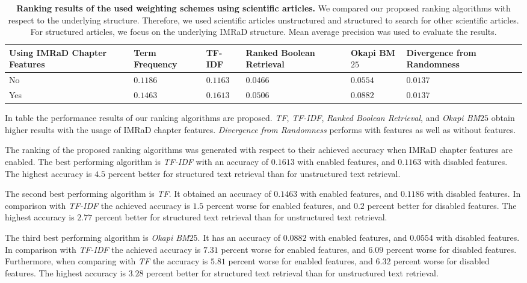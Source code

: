 \begin{table}[b!]
    \centering
    \begin{tabular}{ C{2.1cm} C{2.1cm} C{2.1cm} C{2.1cm} C{2.1cm} C{2.1cm} }
      \toprule
      \textbf{Using IMRaD Chapter Features} & \textbf{Term Frequency} & \textbf{TF-IDF} & \textbf{Ranked Boolean Retrieval} & \textbf{Okapi BM$25$} & \textbf{Divergence from Randomness} \\ \midrule
      No  & $0.1186$ & $0.1163$ & $0.0466$ & $0.0554$ & $0.0137$ \\
      Yes & $0.1463$ & $0.1613$ & $0.0506$ & $0.0882$ & $0.0137$ \\
      \bottomrule
    \end{tabular}
  \caption[Ranking results using scientific articles]{\textbf{Ranking results of the used weighting schemes using scientific articles.} We compared our proposed ranking algorithms with respect to the underlying structure. Therefore, we used scientific articles unstructured and structured to search for other scientific articles. For structured articles, we focus on the underlying IMRaD structure. Mean average precision was used to evaluate the results.}
  \label{tbl:ranking_result_full}
\end{table}

In table  the performance results of our ranking algorithms are proposed. \textit{TF}, \textit{TF-IDF}, \textit{Ranked Boolean Retrieval}, and \textit{Okapi BM$25$} obtain higher results with the usage of IMRaD chapter features. \textit{Divergence from Randomness} performs with features as well as without features.

The ranking of the proposed ranking algorithms was generated with respect to their achieved accuracy when IMRaD chapter features are enabled.  The best performing algorithm is \textit{TF-IDF} with an accuracy of $0.1613$ with enabled features, and $0.1163$ with disabled features. The highest accuracy is $4.5$ percent better for structured text retrieval than for unstructured text retrieval.

The second best performing algorithm is \textit{TF}. It obtained an accuracy of $0.1463$ with enabled features, and $0.1186$ with disabled features. In comparison with \textit{TF-IDF} the achieved accuracy is $1.5$ percent worse for enabled features, and $0.2$ percent better for disabled features. The highest accuracy is $2.77$ percent better for structured text retrieval than for unstructured text retrieval.

The third best performing algorithm is \textit{Okapi BM$25$}. It has an accuracy of $0.0882$ with enabled features, and $0.0554$ with disabled features. In comparison with \textit{TF-IDF} the achieved accuracy is $7.31$ percent worse for enabled features, and $6.09$ percent worse for disabled features. Furthermore, when comparing with \textit{TF} the accuracy is $5.81$ percent worse for enabled features, and $6.32$ percent worse for disabled features. The highest accuracy is $3.28$ percent better for structured text retrieval than for unstructured text retrieval.

